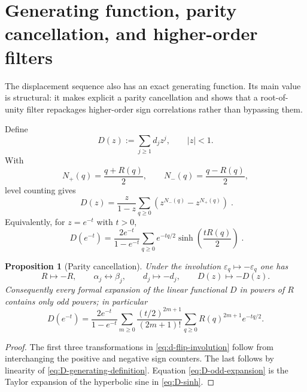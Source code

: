 \documentclass[11pt]{amsart}
\numberwithin{equation}{section}
\theoremstyle{plain}
\newtheorem{proposition}[theorem]{Proposition}
\theoremstyle{definition}
\theoremstyle{remark}
\begin{document}
\section{Generating function, parity cancellation, and higher-order filters}
\label{sec:d-generating}

The displacement sequence also has an exact generating function.  Its main
value is structural: it makes explicit a parity cancellation and shows that a
root-of-unity filter repackages higher-order sign correlations rather than
bypassing them.

Define
\begin{equation}
\label{eq:D-generating-definition}
D(z):=\sum_{j\ge1}d_jz^j,
\qquad |z|<1.
\end{equation}
With
\begin{equation}
\label{eq:Nplusminus-squarefree}
N_+(q)=\frac{q+R(q)}2,
\qquad
N_-(q)=\frac{q-R(q)}2,
\end{equation}
level counting gives
\begin{equation}
\label{eq:D-level-counting}
\boxed{\;
D(z)=\frac{z}{1-z}\sum_{q\ge0}
\left(z^{N_-(q)}-z^{N_+(q)}\right)
\;}.
\end{equation}
Equivalently, for $z=e^{-t}$ with $t>0$,
\begin{equation}
\label{eq:D-sinh}
\boxed{\;
D(e^{-t})=
\frac{2e^{-t}}{1-e^{-t}}
\sum_{q\ge0}e^{-tq/2}
\sinh\!\left(\frac{tR(q)}2\right)
\;}.
\end{equation}

\begin{proposition}[Parity cancellation]
\label{prop:d-parity-cancellation}
Under the involution $\varepsilon_q\mapsto-\varepsilon_q$ one has
\begin{equation}
\label{eq:d-flip-involution}
R\mapsto-R,
\qquad
\alpha_j\leftrightarrow\beta_j,
\qquad
d_j\mapsto-d_j,
\qquad
D(z)\mapsto-D(z).
\end{equation}
Consequently every formal expansion of the linear functional $D$ in powers of
$R$ contains only odd powers; in particular
\begin{equation}
\label{eq:D-odd-expansion}
D(e^{-t})=
\frac{2e^{-t}}{1-e^{-t}}
\sum_{m\ge0}\frac{(t/2)^{2m+1}}{(2m+1)!}
\sum_{q\ge0}R(q)^{2m+1}e^{-tq/2}.
\end{equation}
\end{proposition}

\begin{proof}
The first three transformations in \eqref{eq:d-flip-involution} follow from
interchanging the positive and negative sign counters.  The last follows by
linearity of \eqref{eq:D-generating-definition}.  Equation
\eqref{eq:D-odd-expansion} is the Taylor expansion of the hyperbolic sine in
\eqref{eq:D-sinh}.
\end{proof}
\end{document}
